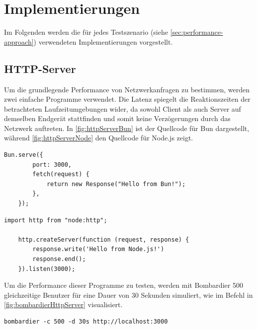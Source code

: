 \section{Implementierungen} \label{sec:performance-implementations}
Im Folgenden werden die für jedes Testszenario (siehe \autoref{sec:performance-approach}) verwendeten Implementierungen vorgestellt.

\subsection{HTTP-Server} \label{subsec:httpServer}
Um die grundlegende Performance von Netzwerkanfragen zu bestimmen, werden zwei einfache Programme verwendet. Die Latenz spiegelt die Reaktionszeiten der betrachteten Laufzeitumgebungen wider, da sowohl Client als auch Server auf demselben Endgerät stattfinden und somit keine Verzögerungen durch das Netzwerk auftreten. In \autoref{fig:httpServerBun} ist der Quellcode für Bun dargestellt, während \autoref{fig:httpServerNode} den Quellcode für Node.js zeigt.

\begin{lstlisting}[caption={[HTTP-Server Bun]HTTP-Server Bun\\\textit{Quelle: Eigene Darstellung}},label={fig:httpServerBun}]
	Bun.serve({
		port: 3000,
		fetch(request) {
			return new Response("Hello from Bun!");
		},
	});
\end{lstlisting}

\begin{lstlisting}[caption={[HTTP-Server Node.js]HTTP-Server Node.js\\\textit{Quelle: Eigene Darstellung}},label={fig:httpServerNode}]
	import http from "node:http";
	
	http.createServer(function (request, response) {
		response.write('Hello from Node.js!')
		response.end();
	}).listen(3000);
\end{lstlisting}

\noindent
Um die Performance dieser Programme zu testen, werden mit Bombardier 500 gleichzeitige Benutzer für eine Dauer von 30 Sekunden simuliert, wie im Befehl in \autoref{fig:bombardierHttpServer} visualisiert.

\begin{lstlisting}[caption={[Bombardier HTTP-Server]Bombardier HTTP-Server\\\textit{Quelle: Eigene Darstellung}},label={fig:bombardierHttpServer}]
	bombardier -c 500 -d 30s http://localhost:3000
\end{lstlisting}

